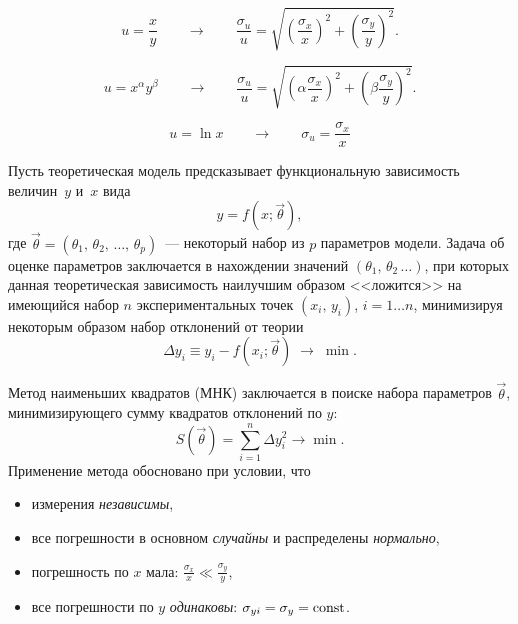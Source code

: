 \begin{booksupplement}
\begin{description}[font=\mdseries\sffamily]
\item[Погрешность частного:]
\[
u = \frac{x}{y} \qquad \to \qquad \frac{\sigma_u}{u} = 
\sqrt{\left(\frac{\sigma_x}{x}\right)^2 + \left(\frac{\sigma_y}{y}\right)^2}.
\]

\item[Погрешность степенной функции:]
\[
u = x^{\alpha} y^{\beta} \qquad \to \qquad \frac{\sigma_u}{u} = 
\sqrt{\left(\alpha \frac{\sigma_x}{x}\right)^2 + \left(\beta \frac{\sigma_y}{y}\right)^2}.
\]
\item[Погрешность логарифма:]
\[
u = \ln x \qquad \to \qquad \sigma_u = \frac{\sigma_x}{x}
\]
\end{description}


    
Пусть теоретическая модель предсказывает функциональную зависимость величин~$y$ и~$x$ 
вида 
\[
y=f(x; \vec{\theta}), 
\]
где $\vec{\theta}=(\theta_1,\,\theta_2,\,\ldots,\,\theta_p)$~--- 
некоторый набор из $p$ параметров модели.
Задача об оценке параметров заключается в нахождении значений 
$(\theta_1,\,\theta_2\,\ldots)$, при которых данная теоретическая зависимость 
наилучшим образом <<ложится>> на имеющийся 
набор $n$ экспериментальных точек $(x_i,\,y_i)$, $i=1\ldots n$, 
минимизируя некоторым образом набор отклонений от теории
\[
\Delta y_i \equiv y_i - f(x_i; \vec{\theta}) \;\to \; \min.
\]

    
Метод наименьших квадратов (МНК) заключается в поиске набора параметров $\vec{\theta}$,
минимизирующего сумму квадратов отклонений по $y$:
\[
S(\vec{\theta}) = \sum\limits_{i=1}^n \Delta y_i^2 \to \min.
\]
Применение метода обосновано при условии, что
\begin{itemize}[itemsep=0pt]
    \item измерения \emph{независимы},
    \item все погрешности в основном \emph{случайны} и распределены \emph{нормально},
    \item погрешность по $x$ мала: $\frac{\sigma_{x}}{x} \ll \frac{\sigma_y}{y}$,
    \item все погрешности по $y$ \emph{одинаковы}: $\sigma_{yi} = \sigma_y = \mathrm{const}$.
\end{itemize}


\end{booksupplement}
